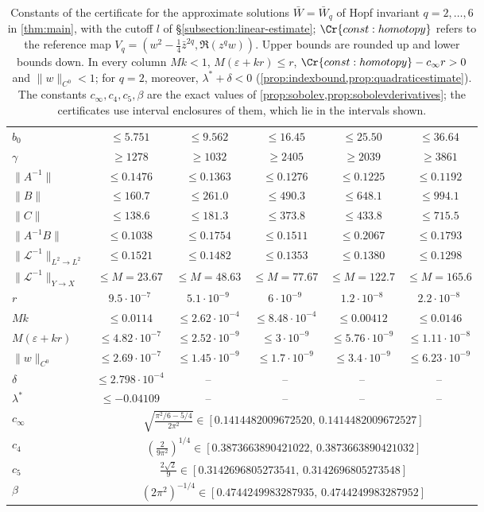 \begin{table}[H]
\begin{tabular}{lccccc}
$b_0$ & $\le 5.751$ & $\le 9.562$ & $\le 16.45$ & $\le 25.50$ & $\le 36.64$\\
$\gamma$ & $\ge 1278$ & $\ge 1032$ & $\ge 2405$ & $\ge 2039$ & $\ge 3861$\\
$\|A^{-1}\|$ & $\le 0.1476$ & $\le 0.1363$ & $\le 0.1276$ & $\le 0.1225$ & $\le 0.1192$\\
$\|B\|$ & $\le 160.7$ & $\le 261.0$ & $\le 490.3$ & $\le 648.1$ & $\le 994.1$\\
$\|C\|$ & $\le 138.6$ & $\le 181.3$ & $\le 373.8$ & $\le 433.8$ & $\le 715.5$\\
$\|A^{-1}B\|$ & $\le 0.1038$ & $\le 0.1754$ & $\le 0.1511$ & $\le 0.2067$ & $\le 0.1793$\\
$\|\mathscr L^{-1}\|_{L^2\to L^2}$ & $\le 0.1521$ & $\le 0.1482$ & $\le 0.1353$ & $\le 0.1380$ & $\le 0.1298$\\
$\|\mathscr L^{-1}\|_{Y\to X}$ & $\le M=23.67$ & $\le M=48.63$ & $\le M=77.67$ & $\le M=122.7$ & $\le M=165.6$\\
$r$ & $9.5\cdot 10^{-7}$ & $5.1\cdot 10^{-9}$ & $6\cdot 10^{-9}$ & $1.2\cdot 10^{-8}$ & $2.2\cdot 10^{-8}$\\
$Mk$ & $\le 0.0114$ & $\le 2.62\cdot 10^{-4}$ & $\le 8.48\cdot 10^{-4}$ & $\le 0.00412$ & $\le 0.0146$\\
$M(\varepsilon+kr)$ & $\le 4.82\cdot 10^{-7}$ & $\le 2.52\cdot 10^{-9}$ & $\le 3\cdot 10^{-9}$ & $\le 5.76\cdot 10^{-9}$ & $\le 1.11\cdot 10^{-8}$\\
$\|w\|_{C^0}$ & $\le 2.69\cdot 10^{-7}$ & $\le 1.45\cdot 10^{-9}$ & $\le 1.7\cdot 10^{-9}$ & $\le 3.4\cdot 10^{-9}$ & $\le 6.23\cdot 10^{-9}$\\
$\delta$ & $\le 2.798\cdot 10^{-4}$ & -- & -- & -- & --\\
$\lambda^*$ & $\le -0.04109$ & -- & -- & -- & --\\
\midrule
$c_\infty$ & \multicolumn{5}{c}{$\sqrt{\frac{\pi^2/6-5/4}{2\pi^2}}\in[0.1414482009672520,\,0.1414482009672527]$}\\[2pt]
$c_4$ & \multicolumn{5}{c}{$\left(\frac{2}{9\pi^2}\right)^{1/4}\in[0.3873663890421022,\,0.3873663890421032]$}\\[2pt]
$c_5$ & \multicolumn{5}{c}{$\frac{2\sqrt2}{9}\in[0.3142696805273541,\,0.3142696805273548]$}\\[2pt]
$\beta$ & \multicolumn{5}{c}{$(2\pi^2)^{-1/4}\in[0.4744249983287935,\,0.4744249983287952]$}\\[2pt]
\bottomrule
\end{tabular}
\caption{Constants of the certificate for the approximate solutions $\bar W=\bar W_q$ of Hopf invariant $q=2,\dots,6$ in \cref{thm:main}, with the cutoff $l$ of \S\ref{subsection:linear-estimate}; $\Cr{const:homotopy}$ refers to the reference map $V_q=(w^2-\frac14\bar z^{2q},\Re(z^qw))$. Upper bounds are rounded up and lower bounds down. In every column $Mk<1$, $M(\varepsilon+kr)\le r$, $\Cr{const:homotopy}-c_\infty r>0$ and $\|w\|_{C^0}<1$; for $q=2$, moreover, $\lambda^*+\delta<0$ (\cref{prop:indexbound,prop:quadraticestimate}). The constants $c_\infty,c_4,c_5,\beta$ are the exact values of \cref{prop:sobolev,prop:sobolevderivatives}; the certificates use interval enclosures of them, which lie in the intervals shown.}
\label{master-table}
\end{table}
